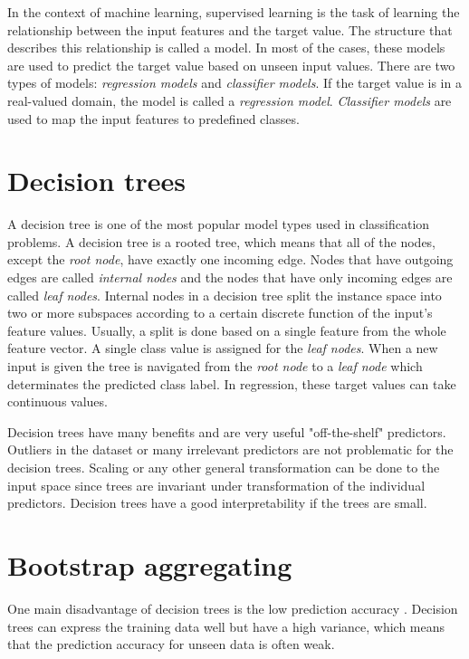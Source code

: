 In the context of machine learning, supervised learning is the task of learning the relationship between the input features and the target value. The structure that describes this relationship is called a model. In most of the cases, these models are used to predict the target value based on unseen input values. There are two types of models: \textit{regression models} and \textit{classifier models}. If the target value is in a real-valued domain, the model is called a \textit{regression model}. \textit{Classifier models} are used to map the input features to predefined classes. \cite{rokach2005top}

\section{Decision trees}
A decision tree is one of the most popular model types used in classification problems. A decision tree is a rooted tree, which means that all of the nodes, except the \textit{root node}, have exactly one incoming edge. Nodes that have outgoing edges are called \textit{internal nodes} and the nodes that have only incoming edges are called \textit{leaf nodes}. Internal nodes in a decision tree split the instance space into two or more subspaces according to a certain discrete function of the input's feature values. Usually, a split is done based on a single feature from the whole feature vector. A single class value is assigned for the \textit{leaf nodes}. When a new input is given the tree is navigated from the \textit{root node} to a \textit{leaf node} which determinates the predicted class label. In regression, these target values can take continuous values. \cite{rokach2005top}

Decision trees have many benefits and are very useful "off-the-shelf" predictors. Outliers in the dataset or many irrelevant predictors are not problematic for the decision trees. Scaling or any other general transformation can be done to the input space since trees are invariant under transformation of the individual predictors. \cite{friedman2001elements} Decision trees have a good interpretability if the trees are small.

\section{Bootstrap aggregating}
One main disadvantage of decision trees is the low prediction accuracy \cite{friedman2001elements}. Decision trees can express the training data well but have a high variance, which means that the prediction accuracy for unseen data is often weak.

